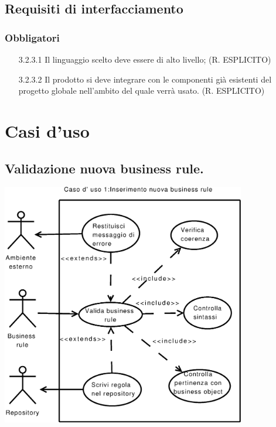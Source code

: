\documentclass[11pt,titlepage,a4paper]{report}
\begin{document}
\section{Requisiti di interfacciamento}
\subsection{Obbligatori}
\begin{itemize}
\item[3.2.3.1]Il linguaggio scelto deve essere di alto livello; (R. ESPLICITO)
\item[3.2.3.2]Il prodotto si deve integrare con le componenti gi\`a esistenti del progetto globale nell'ambito del quale verr\`a usato. (R. ESPLICITO)
\end{itemize}
\chapter{Casi d'uso}
\section{Validazione nuova business rule.}
\begin{center}
 \includegraphics[width=0.8\textwidth]{Inserisci-regola.eps}
\end{center}
\end{document}
